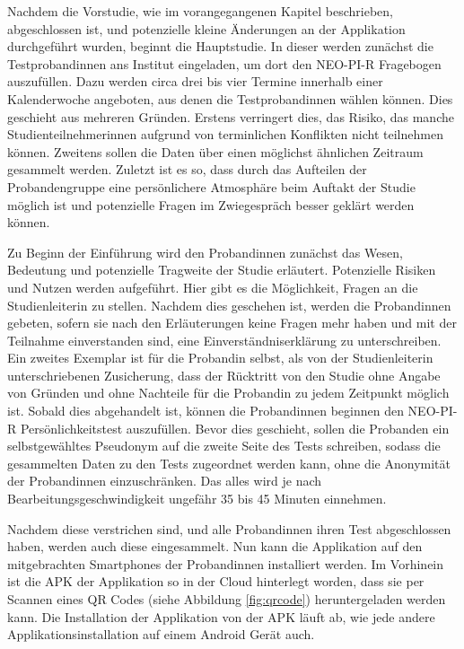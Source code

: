 Nachdem die Vorstudie, wie im vorangegangenen Kapitel beschrieben, abgeschlossen ist, und potenzielle kleine Änderungen an der Applikation durchgeführt wurden, beginnt die Hauptstudie.
In dieser werden zunächst die Testprobandinnen ans Institut eingeladen, um dort den NEO-PI-R Fragebogen auszufüllen.
Dazu werden circa drei bis vier Termine innerhalb einer Kalenderwoche angeboten, aus denen die Testprobandinnen wählen können.
Dies geschieht aus mehreren Gründen. 
Erstens verringert dies, das Risiko, das manche Studienteilnehmerinnen aufgrund von terminlichen Konflikten nicht teilnehmen können.
Zweitens sollen die Daten über einen möglichst ähnlichen Zeitraum gesammelt werden.
Zuletzt ist es so, dass durch das Aufteilen der Probandengruppe eine persönlichere Atmosphäre beim Auftakt der Studie möglich ist
und potenzielle Fragen im Zwiegespräch besser geklärt werden können.
\par
Zu Beginn der Einführung wird den Probandinnen zunächst das Wesen, Bedeutung und potenzielle Tragweite der Studie erläutert.
Potenzielle Risiken und Nutzen werden aufgeführt.
Hier gibt es die Möglichkeit, Fragen an die Studienleiterin zu stellen.
Nachdem dies geschehen ist, werden die Probandinnen gebeten, sofern sie nach den Erläuterungen keine Fragen mehr haben und mit der Teilnahme einverstanden sind, eine Einverständniserklärung zu unterschreiben.
Ein zweites Exemplar ist für die Probandin selbst, als von der Studienleiterin unterschriebenen Zusicherung, dass der Rücktritt von den Studie ohne Angabe von Gründen und ohne Nachteile für die Probandin zu jedem Zeitpunkt möglich ist.
Sobald dies abgehandelt ist, können die Probandinnen beginnen den NEO-PI-R Persönlichkeitstest auszufüllen.
Bevor dies geschieht, sollen die Probanden ein selbstgewähltes Pseudonym auf die zweite Seite des Tests schreiben, sodass die gesammelten Daten zu den Tests zugeordnet werden kann, ohne die Anonymität der Probandinnen einzuschränken.
Das alles wird je nach Bearbeitungsgeschwindigkeit ungefähr 35 bis 45 Minuten einnehmen.
\par
Nachdem diese verstrichen sind, und alle Probandinnen ihren Test abgeschlossen haben, werden auch diese eingesammelt.
Nun kann die Applikation auf den mitgebrachten Smartphones der Probandinnen installiert werden.
Im Vorhinein ist die APK der Applikation so in der Cloud hinterlegt worden, dass sie per Scannen eines QR Codes (siehe Abbildung \ref{fig:qrcode}) heruntergeladen werden kann.
Die Installation der Applikation von der APK läuft ab, wie jede andere Applikationsinstallation auf einem Android Gerät auch.
